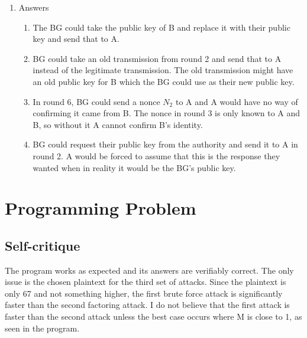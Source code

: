 \documentclass{article}
\begin{document}
\begin{enumerate}
    \item Answers
    \begin{enumerate}
        \item The BG could take the public key of B and replace it with their public key and send that to A.

        \item BG could take an old transmission from round 2 and send that to A instead of the legitimate transmission. The old transmission might have an old public key for B which the BG could use as their new public key.

        \item In round 6, BG could send a nonce $N_2$ to A and A would have no way of confirming it came from B. The nonce in round 3 is only known to A and B, so without it A cannot confirm B’s identity.

        \item BG could request their public key from the authority and send it to A in round 2. A would be forced to assume that this is the response they wanted when in reality it would be the BG’s public key.
        
    \end{enumerate}
\end{enumerate}    

\section*{Programming Problem}
    \subsection*{Self-critique}
        The program works as expected and its answers are verifiably correct. The only issue is the chosen plaintext for the third set of attacks. Since the plaintext is only 67 and not something higher, the first brute force attack is significantly faster than the second factoring attack. I do not believe that the first attack is faster than the second attack unless the best case occurs where M is close to 1, as seen in the program.
    
    \newpage
\end{document}
